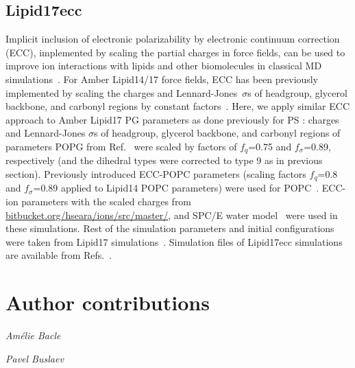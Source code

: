 \documentclass[journal=jpcbfk]{achemso}
\begin{document}
\subsection{Lipid17ecc}
Implicit inclusion of electronic polarizability by electronic continuum correction (ECC),
implemented by scaling the partial charges in force fields, can be used to improve ion interactions with lipids
and other biomolecules in classical MD simulations~\cite{dijon20}.
For Amber Lipid14/17 force fields, ECC has been previously implemented by scaling the
charges and Lennard-Jones~$\sigma$s of headgroup, glycerol backbone, and carbonyl regions
by constant factors~\cite{melcr18,melcr20}.
Here, we apply similar ECC approach to Amber Lipid17 PG parameters as done previously for PS \cite{melcr20}:
charges and Lennard-Jones $\sigma$s of headgroup, glycerol backbone, and carbonyl regions
of parameters POPG from Ref.~ were scaled by factors of $f_q$=0.75 and $f_\sigma$=0.89, respectively
(and the dihedral types were corrected to type 9 as in previous section).
Previously introduced ECC-POPC parameters (scaling factors $f_q$=0.8 and $f_\sigma$=0.89 applied to Lipid14 POPC parameters)
were used for POPC~\cite{melcr18}.
ECC-ion parameters with the scaled charges \cite{pluharova14,kohagen16,martinek18}
from \url{bitbucket.org/hseara/ions/src/master/}, and SPC/E water model~\cite{berendsen87} were used in these simulations. 
Rest of the simulation parameters and initial configurations were taken from Lipid17
simulations~\cite{Lipid17POPCPOPG8020,Lipid17POPCPOPG8020100mMCaCl,Lipid17POPCPOPG80201000mMCaCl,Lipid17POPCPOPG5050,Lipid17POPCPOPG5050100mMCaCl,Lipid17POPCPOPG50501000mMCaCl}.
Simulation files of Lipid17ecc simulations are available from
Refs.~.




\clearpage

\section{Author contributions}
\noindent
{\it Am{\'e}lie Bacle}

\noindent
{\it Pavel Buslaev}
\end{document}
